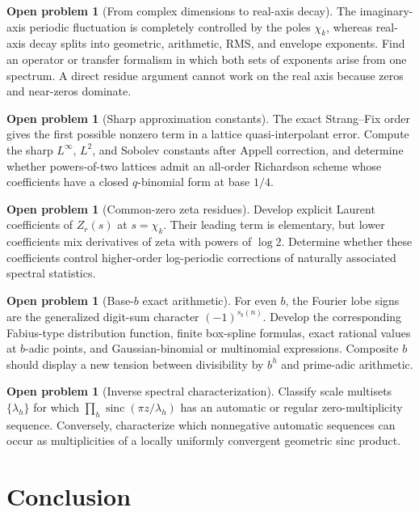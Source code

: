 \documentclass[11pt,oneside]{article}
\numberwithin{equation}{section}
\theoremstyle{definition}
\newtheorem{problem}[theorem]{Open problem}
\theoremstyle{remark}
\newcommand{\sinc}{\operatorname{sinc}}
\begin{document}
\begin{problem}[From complex dimensions to real-axis decay]
The imaginary-axis periodic fluctuation is completely controlled by the poles
$\chi_k$, whereas real-axis decay splits into geometric, arithmetic, RMS, and
envelope exponents.  Find an operator or transfer formalism in which both sets of
exponents arise from one spectrum.  A direct residue argument cannot work on the
real axis because zeros and near-zeros dominate.
\end{problem}

\begin{problem}[Sharp approximation constants]
The exact Strang--Fix order gives the first possible nonzero term in a lattice
quasi-interpolant error.  Compute the sharp $L^\infty$, $L^2$, and Sobolev
constants after Appell correction, and determine whether powers-of-two lattices
admit an all-order Richardson scheme whose coefficients have a closed
$q$-binomial form at base $1/4$.
\end{problem}

\begin{problem}[Common-zero zeta residues]
Develop explicit Laurent coefficients of $Z_r(s)$ at $s=\chi_k$.  Their leading
term is elementary, but lower coefficients mix derivatives of zeta with powers
of $\log2$.  Determine whether these coefficients control higher-order
log-periodic corrections of naturally associated spectral statistics.
\end{problem}

\begin{problem}[Base-$b$ exact arithmetic]
For even $b$, the Fourier lobe signs are the generalized digit-sum character
$(-1)^{s_b(n)}$.  Develop the corresponding Fabius-type distribution function,
finite box-spline formulas, exact rational values at $b$-adic points, and
Gaussian-binomial or multinomial expressions.  Composite $b$ should display a
new tension between divisibility by $b^h$ and prime-adic arithmetic.
\end{problem}

\begin{problem}[Inverse spectral characterization]
Classify scale multisets $\{\lambda_h\}$ for which
$\prod_h\sinc(\pi z/\lambda_h)$ has an automatic or regular zero-multiplicity
sequence.  Conversely, characterize which nonnegative automatic sequences can
occur as multiplicities of a locally uniformly convergent geometric sinc
product.
\end{problem}

\section{Conclusion}
\end{document}
